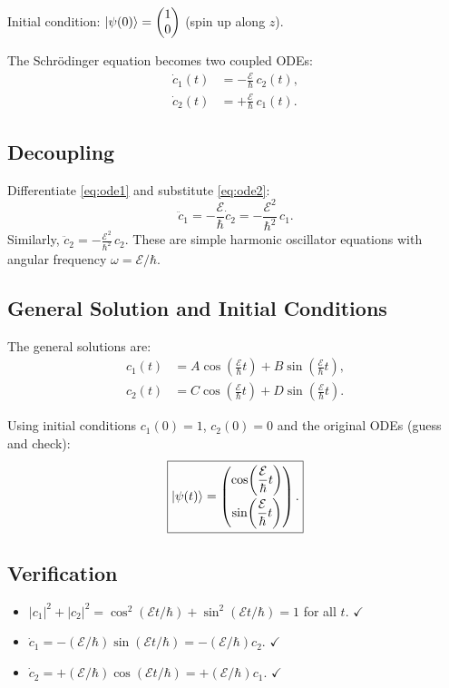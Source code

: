 \documentclass[11pt,a4paper]{article}
\theoremstyle{definition}
\theoremstyle{plain}
\theoremstyle{remark}
\begin{document}
Initial condition: $\ket{\psi(0)} = \begin{pmatrix}1\\0\end{pmatrix}$ (spin up along $z$).

The Schr\"odinger equation becomes two coupled ODEs:
\begin{align}
    \dot{c}_1(t) &= -\frac{\mathcal{E}}{\hbar}\,c_2(t), \label{eq:ode1}\\[4pt]
    \dot{c}_2(t) &= +\frac{\mathcal{E}}{\hbar}\,c_1(t). \label{eq:ode2}
\end{align}

\subsection{Decoupling}

Differentiate \eqref{eq:ode1} and substitute \eqref{eq:ode2}:
\[
    \ddot{c}_1 = -\frac{\mathcal{E}}{\hbar}\dot{c}_2 = -\frac{\mathcal{E}^2}{\hbar^2}\,c_1.
\]
Similarly, $\ddot{c}_2 = -\frac{\mathcal{E}^2}{\hbar^2}\,c_2$. These are simple harmonic oscillator equations with angular frequency $\omega = \mathcal{E}/\hbar$.

\subsection{General Solution and Initial Conditions}

The general solutions are:
\begin{align}
    c_1(t) &= A\cos\!\left(\frac{\mathcal{E}}{\hbar}t\right) + B\sin\!\left(\frac{\mathcal{E}}{\hbar}t\right), \\
    c_2(t) &= C\cos\!\left(\frac{\mathcal{E}}{\hbar}t\right) + D\sin\!\left(\frac{\mathcal{E}}{\hbar}t\right).
\end{align}

Using initial conditions $c_1(0) = 1$, $c_2(0) = 0$ and the original ODEs (guess and check):
\[
    \boxed{\ket{\psi(t)} = \begin{pmatrix}\cos\!\left(\dfrac{\mathcal{E}}{\hbar}t\right) \\[8pt] \sin\!\left(\dfrac{\mathcal{E}}{\hbar}t\right)\end{pmatrix}.}
\]

\subsection{Verification}

\begin{itemize}
    \item $|c_1|^2 + |c_2|^2 = \cos^2(\mathcal{E}t/\hbar) + \sin^2(\mathcal{E}t/\hbar) = 1$ for all $t$. $\checkmark$
    \item $\dot{c}_1 = -(\mathcal{E}/\hbar)\sin(\mathcal{E}t/\hbar) = -(\mathcal{E}/\hbar)c_2$. $\checkmark$
    \item $\dot{c}_2 = +(\mathcal{E}/\hbar)\cos(\mathcal{E}t/\hbar) = +(\mathcal{E}/\hbar)c_1$. $\checkmark$
\end{itemize}
\end{document}
